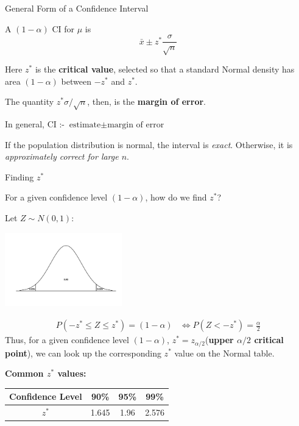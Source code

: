 \documentclass{beamer}\usepackage[]{graphicx}\usepackage[]{color}
\begin{document}
\begin{frame}{General Form of a Confidence Interval}

A $(1-\alpha)$ CI for $\mu$ is
    \[ \bar{x} \pm z^{*}\frac{\sigma}{\sqrt{n}} \] \pause \newline
    
Here $z^{*}$ is the \textbf{critical value}, selected so that a
standard Normal density has area $(1-\alpha)$ between $-z^{*}$ and
$z^{*}$.  \pause \newline

The quantity $z^{*} \sigma /\sqrt{n}$, then, is the
\textbf{margin of error}. \pause

In general, CI :- $\mbox{estimate} \pm \mbox{margin of error} $   \pause \newline 

If the population distribution is normal, the interval is
    \textit{exact}. Otherwise, it is \textit{approximately correct for
      large $n$}.

\end{frame}

\begin{frame}{Finding $z^*$}

For a given confidence level $(1-\alpha)$, how do we find $z^*$?
    
    Let $Z \sim N(0,1)$: \pause
    \centerline{\includegraphics[width=2in]{zstar-eps-converted-to.pdf}}
    \begin{align*}
      P(-z^{*} \leq Z \leq z^{*}) = (1-\alpha)
      &\iff P( Z < -z^{*}) = \frac{\alpha}{2}
    \end{align*}
    \pause
    Thus, for a given confidence level $(1-\alpha)$, $z^*=z_{\alpha/2}$({\bf upper $\alpha/2$ critical point}), we can look up the
    corresponding $z^*$ value on the Normal table. \pause

\vspace{0.05cm}    
 {\bf Common $z^{*}$ values:}
    \begin{center}
      \begin{tabular}{c|ccc}
        Confidence Level& 90\% & 95\% & 99\% \\
        \hline
        $z^{*}$ & 1.645 & 1.96 & 2.576
      \end{tabular}
    \end{center}

\end{frame}
\end{document}
